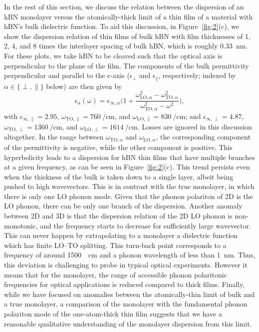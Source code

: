\documentclass[aps,prb,twocolumn,
	           groupedaddress,superscriptaddress,
               amsfonts,amssymb,amsmath,floatfix,
	           citeautoscript]{revtex4-1}
\begin{document}
In the rest of this section, we discuss the relation between the dispersion of an hBN monolayer versus the atomically-thick limit of a thin film of a material with hBN's bulk dielectric function. To aid this discussion, in Figure~\ref{fig:2}(c), we show the dispersion relation of thin films of bulk hBN with film thicknesses of 1, 2, 4, and 8 times the interlayer spacing of bulk hBN, which is roughly \SI{0.33}{\nm}. For these plots, we take hBN to be cleaved such that the optical axis is perpendicular to the plane of the film. The components of the bulk permittivity perpendicular and parallel to the c-axis ($\epsilon_{\perp}$ and $\epsilon_{\parallel}$, respectively; indexed by $\alpha\in\{\perp,\parallel\}$ below) are then given by
\begin{equation}
	\epsilon_{\alpha}(\omega) = \epsilon_{\infty,\alpha}\Bigg(1 + \frac{\omega^2_{\mathrm{LO},\alpha}-\omega^2_{\mathrm{TO},\alpha}}{\omega^2_{\mathrm{TO},\alpha}-\omega^2} \Bigg),
	\label{eq:3deps}
\end{equation}
with $\epsilon_{\infty,\parallel} = \num{2.95}$, $\omega_{\mathrm{TO},\parallel} = \SI{760}{\per\cm}$, and $\omega_{\mathrm{LO},\parallel} = \SI{830}{\per\cm}$; and $\epsilon_{\infty,\perp} = \num{4.87}$, $\omega_{\mathrm{TO},\perp} = \SI{1360}{\per\cm}$, and $\omega_{\mathrm{LO},\perp} = \SI{1614}{\per\cm}$\cite{caldwell2014sub,dai2014tunable}.
Losses are ignored in this discussion altogether. 
In the range between $\omega_{\mathrm{TO}, \alpha}$ and $\omega_{\mathrm{LO}, \alpha}$, the corresponding component of the permittivity is negative, while the other component is positive. This hyperbolicity leads to a dispersion for hBN thin films that have multiple branches at a given frequency, as can be seen in Figure~\ref{fig:2}(c).  This trend persists even when the thickness of the bulk is taken down to a single layer, albeit being pushed to high wavevectors. This is in contrast with the true monolayer, in which there is only one LO phonon mode. Given that the phonon polariton of 2D is the LO phonon, there can be only one branch of the dispersion. Another anomaly between 2D and 3D is that the dispersion relation of the 2D LO phonon is non-monotonic, and the frequency starts to decrease for sufficiently large wavevector. This can never happen by extrapolating to a monolayer a dielectric function which has finite LO--TO splitting. This turn-back point corresponds to a frequency of around \SI{1500}{\per\cm} and a phonon wavelength of less than \SI{1}{\nm}. Thus, this deviation is challenging to probe in typical optical experiments. However it means that for the monolayer, the range of accessible phonon polaritonic frequencies for optical applications is reduced compared to thick films. Finally, while we have focused on anomalies between the atomically-thin limit of bulk and a true monolayer, a comparison of the monolayer with the fundamental phonon polariton mode of the one-atom-thick thin film suggests that we have a reasonable qualitative understanding of the monolayer dispersion from this limit.
\end{document}
